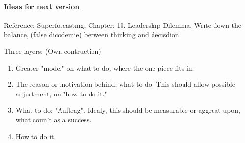 \pagebreak


\paragraph{Ideas for next version}
Reference: Superforcasting, Chapter: 10. Leadership Dilemma.
Write down the balance, (false dicodemie) between thinking and decisdion.

Three layers: (Own contruction)
\begin{enumerate}
	\item Greater "model" on what to do, where the one piece fits in.
	\item The reason or motivation behind, what to do. This should allow possible adjustment, on "how to do it."
	\item What to do: "Auftrag". Idealy, this should be measurable or aggreat upon, what coun't as a success.
	\item How to do it.
\end{enumerate}

